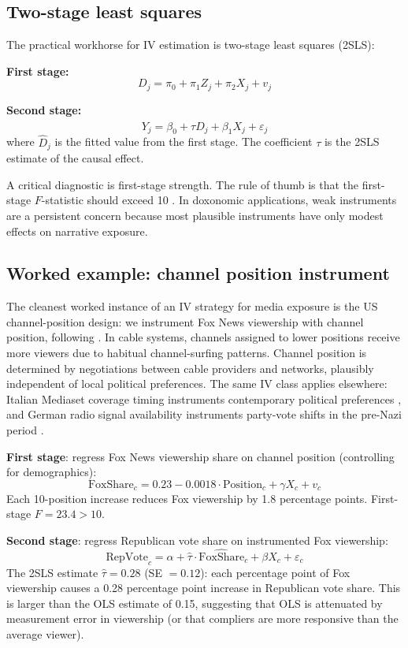 \subsection{Two-stage least squares}

The practical workhorse for IV estimation is two-stage least squares (2SLS):

\medskip
\noindent\textbf{First stage:}
\[
  D_j = \pi_0 + \pi_1 Z_j + \pi_2 X_j + v_j
\]

\noindent\textbf{Second stage:}
\[
  Y_j = \beta_0 + \tau \hat{D}_j + \beta_1 X_j + \varepsilon_j
\]
where $\hat{D}_j$ is the fitted value from the first stage.
The coefficient $\tau$ is the 2SLS estimate of the causal effect.

A critical diagnostic is first-stage strength.
The rule of thumb is that the first-stage $F$-statistic should exceed 10 \autocite{staiger1997}.
In doxonomic applications, weak instruments are a persistent concern because most plausible instruments have only modest effects on narrative exposure.

\subsection{Worked example: channel position instrument}

\begin{example}
\label{ex:iv-channel}
The cleanest worked instance of an IV strategy for media exposure is the US channel-position design: we instrument Fox News viewership with channel position, following \textcite{dellavigna2007}.
In cable systems, channels assigned to lower positions receive more viewers due to habitual channel-surfing patterns.
Channel position is determined by negotiations between cable providers and networks, plausibly independent of local political preferences.
The same IV class applies elsewhere: Italian Mediaset coverage timing instruments contemporary political preferences \autocite{durante2019}, and German radio signal availability instruments party-vote shifts in the pre-Nazi period \autocite{adena2015}.

\medskip
\noindent\textbf{First stage}: regress Fox News viewership share on channel position (controlling for demographics):
\[
  \text{FoxShare}_c = 0.23 - 0.0018 \cdot \text{Position}_c + \gamma X_c + v_c
\]
Each 10-position increase reduces Fox viewership by 1.8 percentage points.
First-stage $F = 23.4 > 10$.

\medskip
\noindent\textbf{Second stage}: regress Republican vote share on instrumented Fox viewership:
\[
  \text{RepVote}_c = \alpha + \hat{\tau} \cdot \widehat{\text{FoxShare}}_c + \beta X_c + \varepsilon_c
\]
The 2SLS estimate $\hat{\tau} = 0.28$ (SE $= 0.12$): each percentage point of Fox viewership causes a 0.28 percentage point increase in Republican vote share.
This is larger than the OLS estimate of 0.15, suggesting that OLS is attenuated by measurement error in viewership (or that compliers are more responsive than the average viewer).
\end{example}

